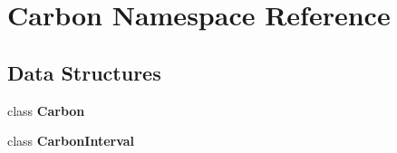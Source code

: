 \section{Carbon Namespace Reference}
\label{namespace_carbon}
\subsection*{Data Structures}
\begin{DoxyCompactItemize}
\item 
class {\bf Carbon}
\item 
class {\bf Carbon\+Interval}
\end{DoxyCompactItemize}
